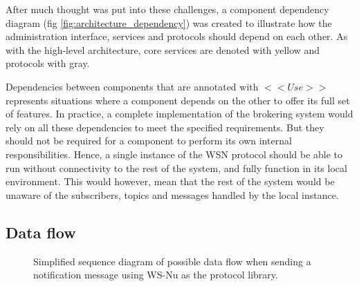 After much thought was put into these challenges, a component dependency diagram (fig \ref{fig:architecture_dependency}) was created to illustrate how the administration interface, services and protocols should depend on each other. As with the high-level architecture, core services are denoted with yellow and protocols with gray.

Dependencies between components that are annotated with $<< Use >>$ represents situations where a component depends on the other to offer its full set of features. In practice, a complete implementation of the brokering system would rely on all these dependencies to meet the specified requirements. But they should not be required for a component to perform its own internal responsibilities. Hence, a single instance of the WSN protocol should be able to run without connectivity to the rest of the system, and fully function in its local environment. This would however, mean that the rest of the system would be unaware of the subscribers, topics and messages handled by the local instance.

\clearpage

\subsection{Data flow}
\label{subsec:architecture_and_implementation-broker_architecture-data_flow}

\begin{center}
  \begin{figure}[ht!]
    \caption{Simplified sequence diagram of possible data flow when sending a notification message using WS-Nu as the protocol library.}
    \label{fig:architecture_data_flow_simple}
  \end{figure}
\end{center}

